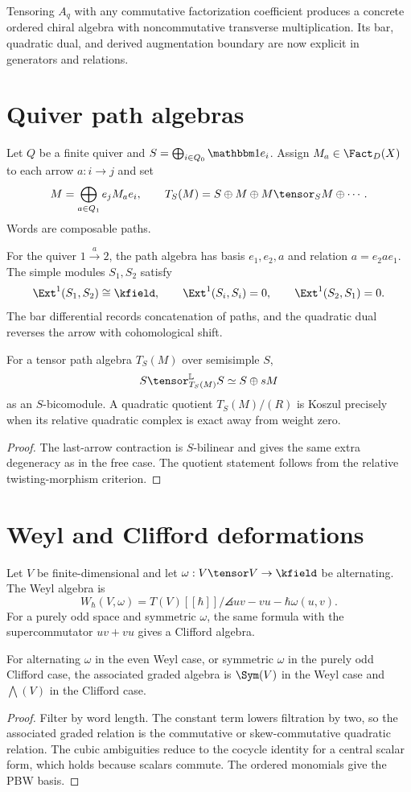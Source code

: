 Tensoring $A_q$ with any commutative factorization coefficient produces a concrete ordered chiral algebra with noncommutative transverse multiplication. Its bar, quadratic dual, and derived augmentation boundary are now explicit in generators and relations.

\chapter{Quiver path algebras}
Let $Q$ be a finite quiver and $S=\bigoplus_{i\in Q_0}\mathbbm1e_i$. Assign $M_a\in\Fact_D(X)$ to each arrow $a:i\to j$ and set
\[
 M=\bigoplus_{a\in Q_1}e_jM_ae_i,
 \qquad
 T_S(M)=S\oplus M\oplus M\tensor_S M\oplus\cdots.
\]
Words are composable paths.

For the quiver $1\xrightarrow{a}2$, the path algebra has basis $e_1,e_2,a$ and relation $a=e_2ae_1$. The simple modules $S_1,S_2$ satisfy
\[
 \Ext^1(S_1,S_2)\cong\kfield,
 \qquad
 \Ext^1(S_i,S_i)=0,
 \qquad
 \Ext^1(S_2,S_1)=0.
\]
The bar differential records concatenation of paths, and the quadratic dual reverses the arrow with cohomological shift.

\begin{theorem}
For a tensor path algebra $T_S(M)$ over semisimple $S$,
\[
 S\tensor_{T_S(M)}^{\mathbb L}S\simeq S\oplus sM
\]
as an $S$-bicomodule. A quadratic quotient $T_S(M)/(R)$ is Koszul precisely when its relative quadratic complex is exact away from weight zero.
\end{theorem}
\begin{proof}
The last-arrow contraction is $S$-bilinear and gives the same extra degeneracy as in the free case. The quotient statement follows from the relative twisting-morphism criterion.
\end{proof}

\chapter{Weyl and Clifford deformations}
Let $V$ be finite-dimensional and let $\omega:V\tensor V\to\kfield$ be alternating. The Weyl algebra is
\[
 W_\hbar(V,\omega)=T(V)[[\hbar]]/
 \angles{uv-vu-\hbar\omega(u,v)}.
\]
For a purely odd space and symmetric $\omega$, the same formula with the supercommutator $uv+vu$ gives a Clifford algebra.

\begin{theorem}
For alternating $\omega$ in the even Weyl case, or symmetric $\omega$ in the purely odd Clifford case, the associated graded algebra is $\Sym(V)$ in the Weyl case and $\bigwedge(V)$ in the Clifford case.
\end{theorem}
\begin{proof}
Filter by word length. The constant term lowers filtration by two, so the associated graded relation is the commutative or skew-commutative quadratic relation. The cubic ambiguities reduce to the cocycle identity for a central scalar form, which holds because scalars commute. The ordered monomials give the PBW basis.
\end{proof}

